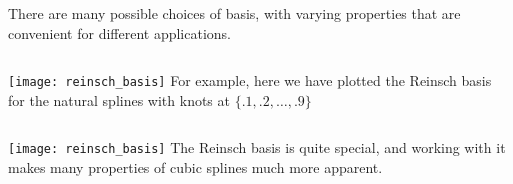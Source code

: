 %
%
\begin{frame}
  There are many possible choices of basis, with varying properties that are convenient for different applications. 
\end{frame}
%
%
\begin{frame}
  \begin{columns}
      \texttt{[image: reinsch\_basis]}
      For example, here we have plotted the Reinsch basis for the natural splines with knots at $\{ .1, .2, \ldots, .9\}$
  \end{columns}
\end{frame}
%
%
\begin{frame}
  \begin{columns}
      \texttt{[image: reinsch\_basis]}
      The Reinsch basis is quite special, and working with it makes many properties of cubic splines much more apparent.
  \end{columns}
  
\end{frame}

